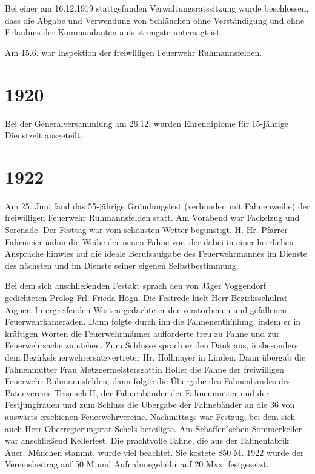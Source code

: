 \documentclass[12pt,a4paper]{book}
\begin{document}
Bei einer am 16.12.1919 stattgefunden Verwaltungsratssitzung wurde beschlossen,
dass die Abgabe und Verwendung von Schläuchen ohne Verständigung und ohne
Erlaubnis der Kommandanten aufs strengste untersagt ist.

Am 15.6. war Inspektion der freiwilligen Feuerwehr Ruhmannsfelden.

\section*{1920}

Bei der Generalversammlung am 26.12. wurden Ehrendiplome für 15-jährige
Dienstzeit ausgeteilt.

\section*{1922}

Am 25. Juni fand das 55-jährige Gründungsfest (verbunden mit Fahnenweihe) der
freiwilligen Feuerwehr Ruhmannsfelden statt. Am Vorabend war Fackelzug und
Serenade. Der Festtag war vom schönsten Wetter begünstigt. H. Hr. Pfarrer
Fahrmeier nahm die Weihe der neuen Fahne vor, der dabei in einer herrlichen
Ansprache hinwies auf die ideale Berufsaufgabe des Feuerwehrmannes im Dienste
des nächsten und im Dienste seiner eigenen Selbstbestimmung.

Bei dem sich anschließenden Festakt sprach den von Jäger Voggendorf gedichteten
Prolog Frl. Frieda Högn. Die Festrede hielt Herr Bezirksschulrat Aigner. In
ergreifenden Worten gedachte er der verstorbenen und gefallenen
Feuerwehrkameraden. Dann folgte durch ihn die Fahnenenthüllung, indem er in
kräftigen Worten die Feuerwehrmänner aufforderte treu zu Fahne und zur
Feuerwehrsache zu stehen. Zum Schlusse sprach er den Dank aus, insbesonders dem
Bezirksfeuerwehrersatzvertreter Hr. Hollmayer in Linden. Dann übergab die
Fahnenmutter Frau Metzgermeistersgattin Holler die Fahne der freiwilligen
Feuerwehr Ruhmannsfelden, dann folgte die Übergabe des Fahnenbandes des
Patenvereins Teisnach II, der Fahnenbänder der Fahnenmutter und der
Festjungfrauen und zum Schluss die Übergabe der Fahnebänder an die 36 von
auswärts erschienen Feuerwehrvereine. Nachmittags war Festzug, bei dem sich auch
Herr Oberregierungsrat Schels beteiligte. Am Schaffer´schen Sommerkeller war
anschließend Kellerfest. Die prachtvolle Fahne, die aus der Fahnenfabrik Auer,
München stammt, wurde viel beachtet. Sie kostete 850 M. 1922 wurde der
Vereinsbeitrag auf 50 M und Aufnahmegebühr auf 20 Mxxi festgesetzt.
\end{document}

